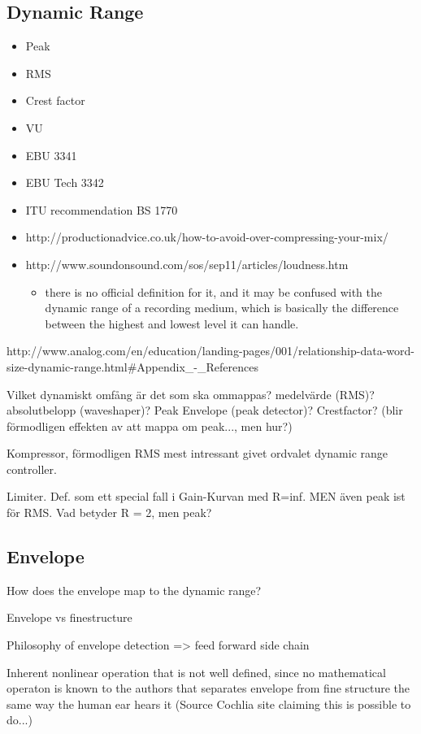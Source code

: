\documentclass[../main2.tex]{subfiles}
\begin{document}
\subsection{Dynamic Range}
\begin{itemize}
\item Peak
\item RMS
\item Crest factor
\item VU
\item EBU 3341 
\item EBU Tech 3342
\item ITU recommendation BS 1770
\item http://productionadvice.co.uk/how-to-avoid-over-compressing-your-mix/
\item http://www.soundonsound.com/sos/sep11/articles/loudness.htm
\begin{itemize}
\item there is no official definition for it, and it may be confused with the dynamic range of a recording medium, which is basically the difference between the highest and lowest level it can handle.
\end{itemize}
\end{itemize}

http://www.analog.com/en/education/landing-pages/001/relationship-data-word-size-dynamic-range.html#Appendix_-_References


Vilket dynamiskt omfång är det som ska ommappas? medelvärde (RMS)? absolutbelopp (waveshaper)? Peak Envelope (peak detector)? Crestfactor? (blir förmodligen effekten av att mappa om peak..., men hur?)

Kompressor, förmodligen RMS mest intressant givet ordvalet dynamic range controller.

Limiter. Def. som ett special fall i Gain-Kurvan med R=inf. MEN även peak ist för RMS. Vad betyder R = 2, men peak?


\subsection{Envelope}
How does the envelope map to the dynamic range?

Envelope vs finestructure

Philosophy of envelope detection => feed forward side chain

Inherent nonlinear operation that is not well defined, since no mathematical operaton is known to the authors that separates envelope from fine structure the same way the human ear hears it (Source Cochlia site claiming this is possible to do...)
\end{document}
